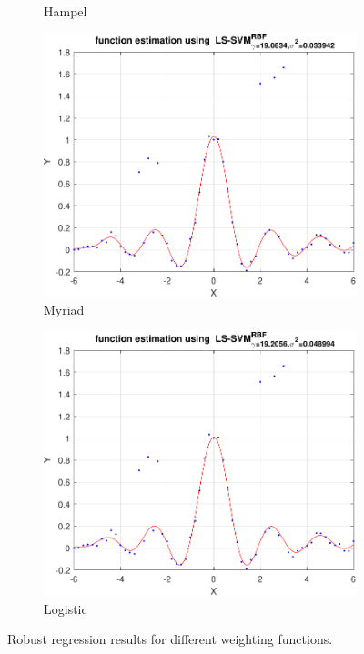 \documentclass{article}
\begin{document}
\begin{figure}[h]
\begin{subfigure}[b]{0.22\textwidth}
                 \caption{Hampel}
                 \label{fig:robust_regression_hampel}
             \end{subfigure}
             \hfill
             \begin{subfigure}[b]{0.22\textwidth}
                 \centering
                 \includegraphics[width=\textwidth]{Assignment 2/figures/1_4/robust_mae_wmyriad.pdf}
                 \caption{Myriad}
                 \label{fig:robust_regression_myriad}
             \end{subfigure}
             \hfill
             \begin{subfigure}[b]{0.22\textwidth}
                 \centering
                 \includegraphics[width=\textwidth]{Assignment 2/figures/1_4/robust_mae_wlogistic.pdf}
                 \caption{Logistic}
                 \label{fig:robust_regression_logistic}
             \end{subfigure}
            \caption{Robust regression results for different weighting functions.}
        \end{figure}
    
\end{document}
